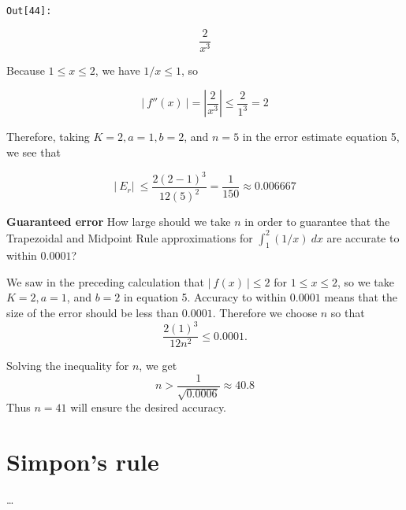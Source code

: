 \documentclass[11pt]{article}
\def\gt{>}
\begin{document}
\texttt{\color{outcolor}Out[{\color{outcolor}44}]:}
    
    $$\frac{2}{x^{3}}$$

    

    Because \(1 \leq x \leq 2\), we have \(1/x \leq 1\), so

\[ |\ f''(x)\ | = \left|\dfrac{2}{x^3}\right| \leq \dfrac{2}{1^3}=2 \]

    Therefore, taking \(K=2,a=1,b=2\), and \(n=5\) in the error estimate
equation 5, we see that

\[ |\ E_r |\ \leq \dfrac{2(2-1)^3}{12(5)^2}=\dfrac{1}{150}\approx0.006667 \]

    \textbf{Guaranteed error} How large should we take \(n\) in order to
guarantee that the Trapezoidal and Midpoint Rule approximations for
\(\int_1^2(1/x)\ dx\) are accurate to within \(0.0001\)?

    We saw in the preceding calculation that \(|\ f(x)\ | \leq 2\) for
\(1\leq x\leq 2\), so we take \(K=2, a=1\), and \(b=2\) in equation 5.
Accuracy to within \(0.0001\) means that the size of the error should be
less than \(0.0001\). Therefore we choose \(n\) so that
\[ \dfrac{2(1)^3}{12n^2}\leq0.0001.\]

Solving the inequality for \(n\), we get
\[ n \gt \dfrac{1}{\sqrt{0.0006}}\approx 40.8 \] Thus \(n=41\) will
ensure the desired accuracy.

    \hypertarget{simpons-rule}{%
\section{Simpon's rule}\label{simpons-rule}}

    \ldots{}


    
    
    
    
\end{document}
